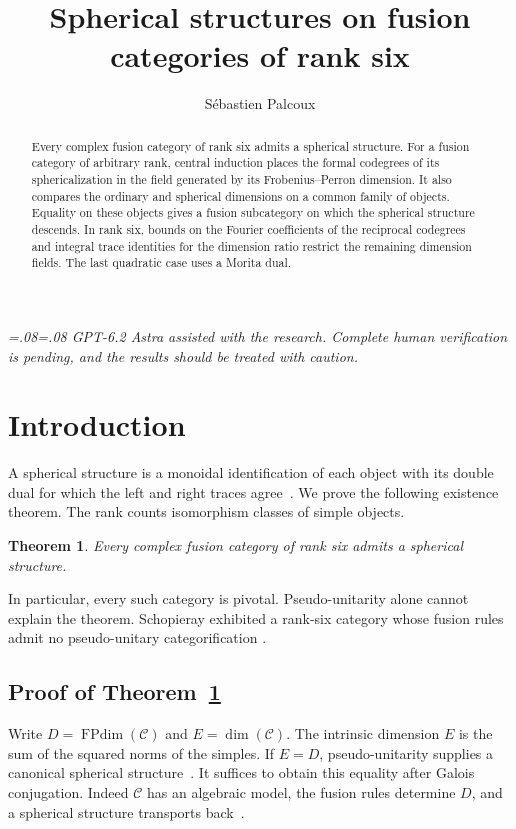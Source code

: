 \documentclass[11pt,reqno]{amsart}
\title[Spherical structures in rank six]{Spherical structures on fusion categories of rank six}
\author{S\'ebastien Palcoux}
\date{}
\newtheorem{theorem}{Theorem}[section]
\theoremstyle{remark}\newtheorem{remark}[theorem]{Remark}
\numberwithin{equation}{section}
\begin{document}
\raggedbottom
\begin{abstract}
Every complex fusion category of rank six admits a spherical structure.
For a fusion category of arbitrary rank, central induction places
the formal codegrees of its sphericalization in the field generated
by its Frobenius--Perron dimension. It also compares the ordinary
and spherical dimensions on a common family of objects. Equality
on these objects gives a fusion subcategory on which the spherical
structure descends. In rank six, bounds on the Fourier coefficients
of the reciprocal codegrees and integral trace identities for the dimension ratio
restrict the remaining dimension fields. The last quadratic case uses a
Morita dual.
\end{abstract}

\maketitle
{\small\itshape\leftskip=.08\linewidth\rightskip=.08\linewidth\noindent
GPT-6.2 Astra assisted with the research. Complete human verification is pending, and
the results should be treated with caution.
\par}

\section{Introduction}
A spherical structure is a monoidal identification of each object with
its double dual for which the left and right traces agree~\cite[\S4.7]{EGNO}.
We prove the following existence theorem. The rank counts isomorphism
classes of simple objects.

\begin{theorem}\label{thm:universal}
Every complex fusion category of rank six admits a spherical structure.
\end{theorem}

In particular, every such category is pivotal. Pseudo-unitarity alone
cannot explain the theorem. Schopieray exhibited a rank-six category
whose fusion rules admit no pseudo-unitary categorification
\cite[Example~1 and Theorem~1]{SchopNP}.

\subsection*{Proof of Theorem~\ref{thm:universal}}
Write $D=\operatorname{FPdim}(\mathcal C)$ and $E=\dim(\mathcal C)$.
The intrinsic dimension $E$ is the sum of the squared norms of the
simples. If $E=D$, pseudo-unitarity supplies a canonical spherical
structure~\cite[Proposition~8.23]{ENO}. It suffices to obtain this
equality after Galois conjugation. Indeed $\mathcal C$ has an algebraic
model, the fusion rules determine $D$, and a spherical structure
transports back~\cite[Theorem~2.30 and the following paragraph]{ENO}.
\end{document}
